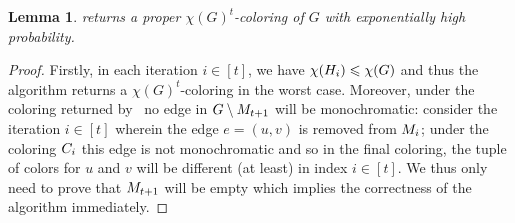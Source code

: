 \documentclass[11pt]{article}
\newtheorem{lemma}{Lemma}[section]
\theoremstyle{definition}
\renewcommand{\leq}{\leqslant}
\begin{document}
\begin{lemma}\label{lem:coloring-alg1}
	 returns a proper $\chi(G)^t$-coloring of $G$ with exponentially high probability. 
\end{lemma}
\begin{proof}
Firstly, in each iteration $i \in [t]$, we have $\chi(\Hi{i}) \leq \chi(G)$ and thus the algorithm returns a $\chi(G)^t$-coloring in the worst case. Moreover, under the coloring returned by~ no edge in $G \setminus M_{t+1}$ will be monochromatic: consider the iteration $i \in [t]$ wherein the edge $e=(u,v)$ is removed from $M_{i}$; under the coloring $C_{i}$ this 
edge is not monochromatic and so in the final coloring, the tuple of colors for $u$ and $v$ will be different (at least) in index $i \in [t]$. We thus only need to prove that $M_{t+1}$ will be empty
which implies the correctness of the algorithm immediately. 


\end{proof}
\end{document}
